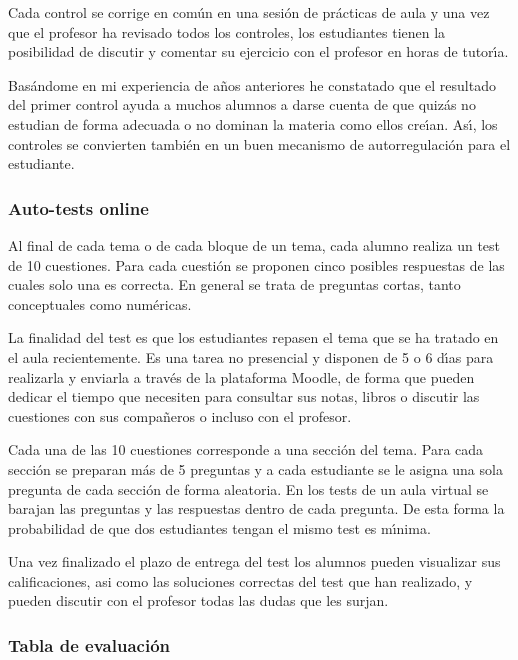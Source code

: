 Cada control se corrige en com\'{u}n en una sesi\'{o}n de pr\'{a}cticas de
 aula y una vez que el profesor ha revisado todos los controles, los
 estudiantes tienen la posibilidad de discutir y comentar su ejercicio
 con el profesor en horas de tutor\'{\i}a.

Bas\'{a}ndome en mi experiencia de a\~{n}os anteriores 
he constatado que el resultado del primer control  ayuda a muchos alumnos
 a darse cuenta de que quiz\'{a}s no estudian de forma adecuada 
o no dominan la materia como ellos
cre\'{\i}an. As\'{\i}, los controles se convierten
 tambi\'{e}n  en un 
buen mecanismo de autorregulaci\'{o}n para el estudiante.



\subsubsection{Auto-tests online}
Al final de cada tema o de cada bloque de un tema, cada alumno realiza
un test de 10 cuestiones. Para cada cuesti\'{o}n se proponen cinco posibles 
respuestas de las cuales solo una es correcta. En general se trata de
 preguntas cortas, tanto conceptuales como num\'{e}ricas.

La finalidad del test es que los estudiantes repasen el tema que se ha
 tratado en el aula recientemente.
 Es una tarea no presencial y disponen de 5 o 6 d\'{\i}as para
 realizarla y enviarla a trav\'{e}s de  la plataforma Moodle,
 de forma que pueden dedicar el tiempo que necesiten
para consultar sus notas, libros o discutir las cuestiones con sus
 compa\~{n}eros o incluso con el profesor. 

Cada una de las 10 cuestiones corresponde a una secci\'{o}n del tema. Para cada
secci\'{o}n se preparan m\'{a}s de 5 preguntas y a cada estudiante
se le asigna una sola pregunta de cada secci\'{o}n de forma aleatoria. 
En los tests de un aula virtual se barajan las preguntas y las respuestas
dentro de cada pregunta.
De esta forma la 
probabilidad de que dos estudiantes tengan el mismo test es m\'{\i}nima.

Una vez finalizado el plazo de entrega del test los alumnos pueden visualizar
sus calificaciones, asi como las soluciones correctas del test que han
 realizado, y pueden discutir con el profesor todas las dudas que les surjan.

\subsubsection{Tabla de evaluaci\'{o}n}

